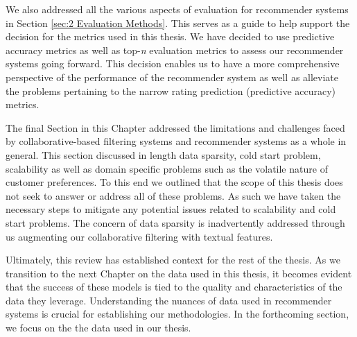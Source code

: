 We also addressed all the various aspects of evaluation for recommender systems in Section \ref{sec:2 Evaluation Methods}. This serves as a guide to help support the decision for the metrics used in this thesis. We have decided to use predictive accuracy metrics as well as top-\textit{n} evaluation metrics to assess our recommender systems going forward. This decision enables us to have a more comprehensive perspective of the performance of the recommender system as well as alleviate the problems pertaining to the narrow rating prediction (predictive accuracy) metrics.

The final Section in this Chapter addressed the limitations and challenges faced by collaborative-based filtering systems and recommender systems as a whole in general. This section discussed in length data sparsity, cold start problem, scalability as well as domain specific problems such as the volatile nature of customer preferences. To this end we outlined that the scope of this thesis does not seek to answer or address all of these problems. As such we have taken the necessary steps to mitigate any potential issues related to scalability and cold start problems. The concern of data sparsity is inadvertently addressed through us augmenting our collaborative filtering with textual features.

Ultimately, this review has established context for the rest of the thesis. As we transition to the next Chapter on the data used in this thesis, it becomes evident that the success of these models is tied to the quality and characteristics of the data they leverage. Understanding the nuances of data used in recommender systems is crucial for establishing our methodologies. In the forthcoming section, we focus on the the data used in our thesis. 








 
